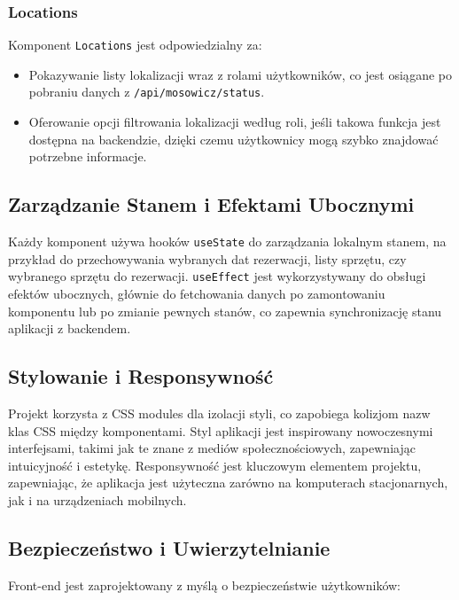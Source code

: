 \documentclass{article}
\begin{document}
\subsubsection{Locations}

Komponent \texttt{Locations} jest odpowiedzialny za:

\begin{itemize}
    \item Pokazywanie listy lokalizacji wraz z rolami użytkowników, co jest osiągane po pobraniu danych z \texttt{/api/mosowicz/status}.
    \item Oferowanie opcji filtrowania lokalizacji według roli, jeśli takowa funkcja jest dostępna na backendzie, dzięki czemu użytkownicy mogą szybko znajdować potrzebne informacje.
\end{itemize}

\subsection{Zarządzanie Stanem i Efektami Ubocznymi}

Każdy komponent używa hooków \texttt{useState} do zarządzania lokalnym stanem, na przykład do przechowywania wybranych dat rezerwacji, listy sprzętu, czy wybranego sprzętu do rezerwacji. \texttt{useEffect} jest wykorzystywany do obsługi efektów ubocznych, głównie do fetchowania danych po zamontowaniu komponentu lub po zmianie pewnych stanów, co zapewnia synchronizację stanu aplikacji z backendem.

\subsection{Stylowanie i Responsywność}

Projekt korzysta z CSS modules dla izolacji styli, co zapobiega kolizjom nazw klas CSS między komponentami. Styl aplikacji jest inspirowany nowoczesnymi interfejsami, takimi jak te znane z mediów społecznościowych, zapewniając intuicyjność i estetykę. Responsywność jest kluczowym elementem projektu, zapewniając, że aplikacja jest użyteczna zarówno na komputerach stacjonarnych, jak i na urządzeniach mobilnych.

\subsection{Bezpieczeństwo i Uwierzytelnianie}

Front-end jest zaprojektowany z myślą o bezpieczeństwie użytkowników:
\end{document}

